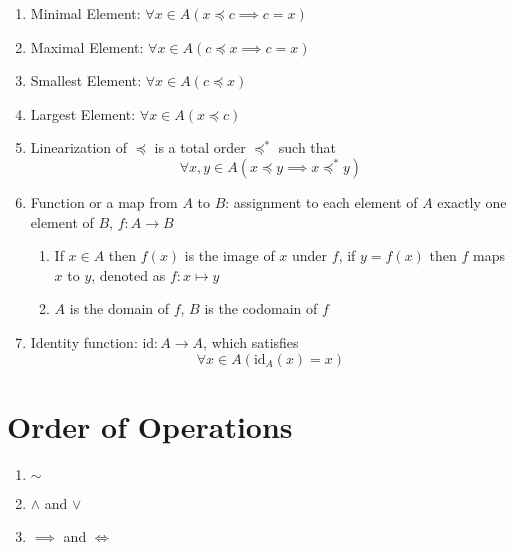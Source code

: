 \documentclass[landscape, a4paper]{article}
\newcommand{\Or}{\vee}
\renewcommand{\and}{\wedge}
\newcommand{\customsection}[1]{%
    \vspace*{-16pt}%
    \section*{#1}%
    \vspace*{-5pt}%
}
\begin{document}
\begin{multicols*}{4}
\begin{enumerate}[wide, labelindent=2pt]
        \item Minimal Element: $\forall x\in A(x\preccurlyeq c\implies c = x)$
        \item Maximal Element: $\forall x\in A(c\preccurlyeq x\implies c = x)$
        \item Smallest Element: $\forall x\in A(c\preccurlyeq x)$
        \item Largest Element: $\forall x\in A(x\preccurlyeq c)$
        \item Linearization of $\preccurlyeq$ is a total order $\preccurlyeq^*$ such that
              \[\forall x,y\in A (x\preccurlyeq y \implies x \preccurlyeq^* y)\]
        \item Function or a map from $A$ to $B$: assignment to each element of $A$ exactly one element of $B$, $f:A\rightarrow B$
              \begin{enumerate}
                  \item If $x\in A$ then $f(x)$ is the image of $x$ under $f$, if $y=f(x)$ then $f$ maps $x$ to $y$, denoted as $f:x\mapsto y$
                  \item $A$ is the domain of $f$, $B$ is the codomain of $f$
              \end{enumerate}
        \item Identity function: id$:A\rightarrow A$, which satisfies
              \[
                  \forall x\in A \left(\text{id}_A(x)=x\right)
              \]
    \end{enumerate}

    \customsection{Order of Operations}
    \begin{enumerate}[wide, labelindent=2pt]
        \item ${\sim}$
        \item $\and$ and $\Or$
        \item $\implies$ and $\iff$
    \end{enumerate}


\end{multicols*}
\end{document}
